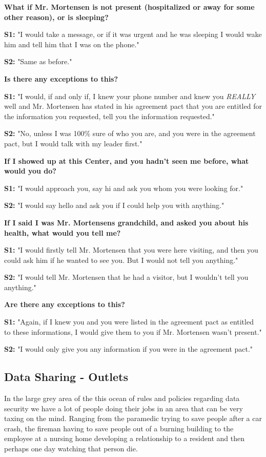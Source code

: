 \documentclass[11pt]{article}
\begin{document}
\textbf{What if Mr. Mortensen is not present (hospitalized or away for some other reason), or is sleeping?}

\textbf{S1:} "I would take a message, or if it was urgent and he was sleeping I would wake him and tell him that I was on the phone."

\textbf{S2:} "Same as before."

\textbf{Is there any exceptions to this?}

\textbf{S1:} "I would, if and only if, I knew your phone number and knew you \textit{REALLY} well and Mr. Mortensen has stated in his agreement pact that you are entitled for the information you requested, tell you the information requested."

\textbf{S2:} "No, unless I was 100\% sure of who you are, and you were in the agreement pact, but I would talk with my leader first."

\textbf{If I showed up at this Center, and you hadn't seen me before, what would you do?}

\textbf{S1:} "I would approach you, say hi and ask you whom you were looking for."

\textbf{S2:} "I would say hello and ask you if I could help you with anything."

\textbf{If I said I was Mr. Mortensens grandchild, and asked you about his health, what would you tell me?}

\textbf{S1:} "I would firstly tell Mr. Mortensen that you were here visiting, and then you could ask him if he wanted to see you. But I would not tell you anything."

\textbf{S2:} "I would tell Mr. Mortensen that he had a visitor, but I wouldn't tell you anything."

\textbf{Are there any exceptions to this?}

\textbf{S1:} "Again, if I knew you and you were listed in the agreement pact as entitled to these informations, I would give them to you if Mr. Mortensen wasn't present."

\textbf{S2:} "I would only give you any information if you were in the agreement pact."


\subsection{Data Sharing - Outlets}
In the large grey area of the this ocean of rules and policies regarding data security we have a lot of people doing their jobs in an area that can be very taxing on the mind. Ranging from the paramedic trying to save people after a car crash, the fireman having to save people out of a burning building to the employee at a nursing home developing a relationship to a resident and then perhaps one day watching that person die.
\end{document}
